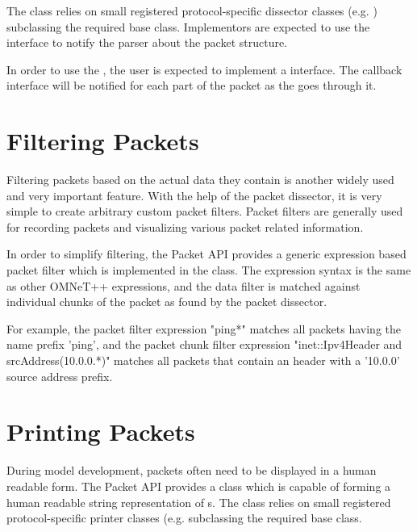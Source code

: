 The  class relies on small registered
protocol-specific dissector classes (e.g. )
subclassing the required  base class. Implementors
are expected to use the  interface to
notify the parser about the packet structure.


In order to use the , the user is expected to
implement a   interface. The callback
interface will be notified for each part of the packet as the
 goes through it.


\section{Filtering Packets}
\label{sec:packets:filtering-packets}

Filtering packets based on the actual data they contain is another widely used
and very important feature. With the help of the packet dissector, it is very
simple to create arbitrary custom packet filters. Packet filters are generally
used for recording packets and visualizing various packet related information.

In order to simplify filtering, the Packet API provides a generic expression
based packet filter which is implemented in the  class.
The expression syntax is the same as other OMNeT++ expressions, and the data
filter is matched against individual chunks of the packet as found by the packet
dissector.

For example, the packet filter expression "ping*" matches all packets having the
name prefix 'ping', and the packet chunk filter expression "inet::Ipv4Header and
srcAddress(10.0.0.*)" matches all packets that contain an  header
with a '10.0.0' source address prefix.


\section{Printing Packets}
\label{sec:packets:printing-packets}

During model development, packets often need to be displayed in a human readable
form. The Packet API provides a  class which is capable
of forming a human readable string representation of s. The
 class relies on small registered protocol-specific
printer classes (e.g.  subclassing the required
 base class.

